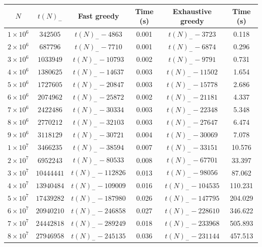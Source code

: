 \documentclass[12pt,a4paper,reqno]{amsart}
\numberwithin{equation}{section}
\theoremstyle{plain}
\theoremstyle{definition}
\begin{document}
      
\begin{table}[ht]
  \centering
  \begin{tabular}{|c|c|c|c|c|c|}
  \hline
  $N$ & $t(N)_-$ & Fast greedy & Time (s) & Exhaustive greedy & Time (s) \\
  \hline
$1 \times 10^6$ & $\num{342505}$ & $t(N)_- - \num{4863}$ & 0.001 & $t(N)_- - \num{3723}$ & 0.118 \\
$2 \times 10^6$ & $\num{687796}$ & $t(N)_- - \num{7710}$ & 0.001 & $t(N)_- - \num{6874}$ & 0.296 \\
$3 \times 10^6$ & $\num{1033949}$ & $t(N)_- - \num{10793}$ & 0.002 & $t(N)_- - \num{9791}$ & 0.731 \\
$4 \times 10^6$ & $\num{1380625}$ & $t(N)_- - \num{14637}$ & 0.003 & $t(N)_- - \num{11502}$ & 1.654 \\
$5 \times 10^6$ & $\num{1727605}$ & $t(N)_- - \num{20847}$ & 0.003 & $t(N)_- - \num{15778}$ & 2.686 \\
$6 \times 10^6$ & $\num{2074962}$ & $t(N)_- - \num{25872}$ & 0.002 & $t(N)_- - \num{21181}$ & 4.337 \\
$7 \times 10^6$ & $\num{2422486}$ & $t(N)_- - \num{30334}$ & 0.003 & $t(N)_- - \num{22348}$ & 5.348 \\
$8 \times 10^6$ & $\num{2770212}$ & $t(N)_- - \num{32103}$ & 0.003 & $t(N)_- - \num{27647}$ & 6.474 \\
$9 \times 10^6$ & $\num{3118129}$ & $t(N)_- - \num{30721}$ & 0.004 & $t(N)_- - \num{30069}$ & 7.078 \\
\hline
$1 \times 10^7$ & $\num{3466235}$ & $t(N)_- - \num{38594}$ & 0.007 & $t(N)_- - \num{33151}$ & 10.576 \\
$2 \times 10^7$ & $\num{6952243}$ & $t(N)_- - \num{80533}$ & 0.008 & $t(N)_- - \num{67701}$ & 33.397 \\
$3 \times 10^7$ & $\num{10444441}$ & $t(N)_- - \num{112826}$ & 0.013 & $t(N)_- - \num{98056}$ & 87.062 \\
$4 \times 10^7$ & $\num{13940484}$ & $t(N)_- - \num{109009}$ & 0.016 & $t(N)_- - \num{104535}$ & 110.231 \\
$5 \times 10^7$ & $\num{17439282}$ & $t(N)_- - \num{187980}$ & 0.026 & $t(N)_- - \num{147795}$ & 204.029 \\
$6 \times 10^7$ & $\num{20940210}$ & $t(N)_- - \num{246858}$ & 0.027 & $t(N)_- - \num{228610}$ & 346.622 \\
$7 \times 10^7$ & $\num{24442818}$ & $t(N)_- - \num{289249}$ & 0.018 & $t(N)_- - \num{233968}$ & 505.893 \\
$8 \times 10^7$ & $\num{27946958}$ & $t(N)_- - \num{245135}$ & 0.036 & $t(N)_- - \num{231144}$ & 457.513 \\

\end{tabular}
\end{table}
\end{document}
